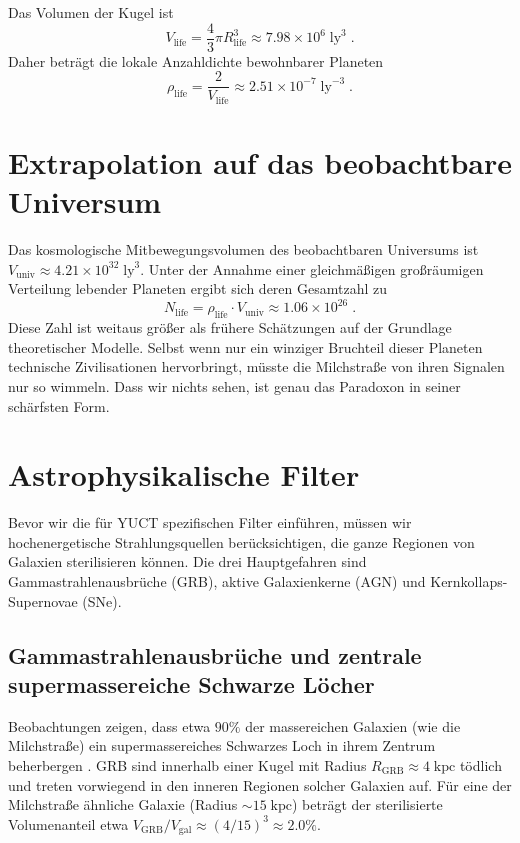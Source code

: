 \documentclass[11pt,a4paper]{article}
\begin{document}
	Das Volumen der Kugel ist
	\begin{equation}
		V_{\mathrm{life}} = \frac{4}{3}\pi R_{\mathrm{life}}^{3}
		\approx 7.98\times 10^{6}\;\mathrm{ly}^{3}\; .
	\end{equation}
	Daher beträgt die lokale Anzahldichte bewohnbarer Planeten
	\begin{equation}
		\rho_{\mathrm{life}} = \frac{2}{V_{\mathrm{life}}}
		\approx 2.51\times 10^{-7}\;\mathrm{ly}^{-3}\; .
	\end{equation}
	
	\section{Extrapolation auf das beobachtbare Universum}
	\label{sec:extrapolation}
	Das kosmologische Mitbewegungsvolumen des beobachtbaren Universums ist
	\(V_{\mathrm{univ}} \approx 4.21\times 10^{32}\;\mathrm{ly}^{3}\).
	Unter der Annahme einer gleichmäßigen großräumigen Verteilung lebender Planeten ergibt sich deren Gesamtzahl zu
	\begin{equation}
		\label{eq:N_life_total}
		N_{\mathrm{life}} = \rho_{\mathrm{life}} \cdot V_{\mathrm{univ}}
		\approx 1.06\times 10^{26}\; .
	\end{equation}
	Diese Zahl ist weitaus größer als frühere Schätzungen auf der Grundlage theoretischer Modelle. Selbst wenn nur ein winziger Bruchteil dieser Planeten technische Zivilisationen hervorbringt, müsste die Milchstraße von ihren Signalen nur so wimmeln. Dass wir nichts sehen, ist genau das Paradoxon in seiner schärfsten Form.
	
	\section{Astrophysikalische Filter}
	\label{sec:astro_filters}
	Bevor wir die für YUCT spezifischen Filter einführen, müssen wir hochenergetische Strahlungsquellen berücksichtigen, die ganze Regionen von Galaxien sterilisieren können. Die drei Hauptgefahren sind Gammastrahlenausbrüche (GRB), aktive Galaxienkerne (AGN) und Kernkollaps-Supernovae (SNe).
	
	\subsection{Gammastrahlenausbrüche und zentrale supermassereiche Schwarze Löcher}
	\label{sec:grb}
	Beobachtungen zeigen, dass etwa \(90\%\) der massereichen Galaxien (wie die Milchstraße) ein supermassereiches Schwarzes Loch in ihrem Zentrum beherbergen \citep{Chandra2025}. GRB sind innerhalb einer Kugel mit Radius \(R_{\mathrm{GRB}} \approx 4\;\mathrm{kpc}\) tödlich und treten vorwiegend in den inneren Regionen solcher Galaxien auf. Für eine der Milchstraße ähnliche Galaxie (Radius \(\sim 15\;\mathrm{kpc}\)) beträgt der sterilisierte Volumenanteil etwa \(V_{\mathrm{GRB}}/V_{\mathrm{gal}} \approx (4/15)^{3} \approx 2.0\%\).
	
\end{document}
